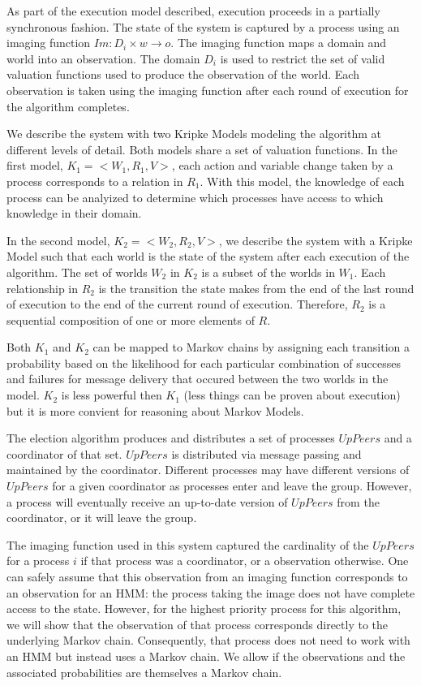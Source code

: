 As part of the execution model described, execution proceeds in a partially synchronous fashion.
The state of the system is captured by a process using an imaging function $Im : D_i \times w \rightarrow o$.
The imaging function maps a domain and world into an observation.
The domain $D_i$ is used to restrict the set of valid valuation functions used to produce the observation of the world.
Each observation is taken using the imaging function after each round of execution for the algorithm completes.

We describe the system with two Kripke Models modeling the algorithm at different levels of detail.
Both models share a set of valuation functions.
In the first model, $K_1 = <W_1, R_1, V>$, each action and variable change taken by a process corresponds to a relation in $R_1$.
With this model, the knowledge of each process can be analyized to determine which processes have access to which knowledge in their domain.

In the second model, $K_2 = <W_2, R_2, V>$, we describe the system with a Kripke Model such that each world is the state of the system after each execution of the algorithm.
The set of worlds $W_2$ in $K_2$ is a subset of the worlds in $W_1$.
Each relationship in $R_2$ is the transition the state makes from the end of the last round of execution to the end of the current round of execution.
Therefore, $R_2$ is a sequential composition of one or more elements of $R$.

Both $K_1$ and $K_2$ can be mapped to Markov chains by assigning each transition a probability based on the likelihood for each particular combination of successes and failures for message delivery that occured between the two worlds in the model.
$K_2$ is less powerful then $K_1$ (less things can be proven about execution) but it is more convient for reasoning about Markov Models.

The election algorithm produces and distributes a set of processes $UpPeers$ and a coordinator of that set.
$UpPeers$ is distributed via message passing and maintained by the coordinator.
Different processes may have different versions of $UpPeers$ for a given coordinator as processes enter and leave the group.
However, a process will eventually receive an up-to-date version of $UpPeers$ from the coordinator, or it will leave the group.

The imaging function used in this system captured the cardinality of the $UpPeers$ for a process $i$ if that process was a coordinator, or a \null observation otherwise.
One can safely assume that this observation from an imaging function corresponds to an observation for an \ac{HMM}: the process taking the image does not have complete access to the state.
However, for the highest priority process for this algorithm, we will show that the observation of that process corresponds directly to the underlying Markov chain.
Consequently, that process does not need to work with an \ac{HMM} but instead uses a Markov chain.
We allow if the observations and the associated probabilities are themselves a Markov chain.

